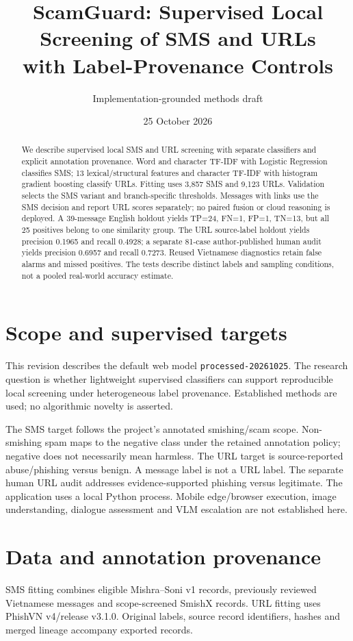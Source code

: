 \documentclass[11pt]{article}
\title{ScamGuard: Supervised Local Screening of SMS and URLs\\with Label-Provenance Controls}
\author{Implementation-grounded methods draft}
\date{25 October 2026}
\begin{document}
\maketitle
\begin{abstract}
We describe supervised local SMS and URL screening with separate classifiers and
explicit annotation provenance. Word and character TF-IDF with Logistic Regression
classifies SMS; 13 lexical/structural features and character TF-IDF with histogram
gradient boosting classify URLs. Fitting uses 3,857 SMS and 9,123 URLs. Validation
selects the SMS variant and branch-specific thresholds. Messages with links use the
SMS decision and report URL scores separately; no paired fusion or cloud reasoning
is deployed. A 39-message English holdout yields TP=24, FN=1, FP=1, TN=13, but all
25 positives belong to one similarity group. The URL source-label holdout yields
precision 0.1965 and recall 0.4928; a separate 81-case author-published human audit
yields precision 0.6957 and recall 0.7273. Reused Vietnamese diagnostics retain
false alarms and missed positives. The tests describe distinct labels and sampling
conditions, not a pooled real-world accuracy estimate.
\end{abstract}

\section{Scope and supervised targets}
This revision describes the default web model \texttt{processed-20261025}.
The research question is whether lightweight supervised classifiers can support
reproducible local screening under heterogeneous label provenance. Established
methods are used; no algorithmic novelty is asserted.

The SMS target follows the project's annotated smishing/scam scope. Non-smishing
spam maps to the negative class under the retained annotation policy; negative does
not necessarily mean harmless. The URL target is source-reported abuse/phishing
versus benign. A message label is not a URL label. The separate human URL audit
addresses evidence-supported phishing versus legitimate.
The application uses a local Python process. Mobile edge/browser execution, image
understanding, dialogue assessment and VLM escalation are not established here.

\section{Data and annotation provenance}
SMS fitting combines eligible Mishra--Soni v1 records, previously reviewed
Vietnamese messages and scope-screened SmishX records. URL fitting uses PhishVN
v4/release v3.1.0. Original labels, source record identifiers, hashes and merged
lineage accompany exported records.
\end{document}
